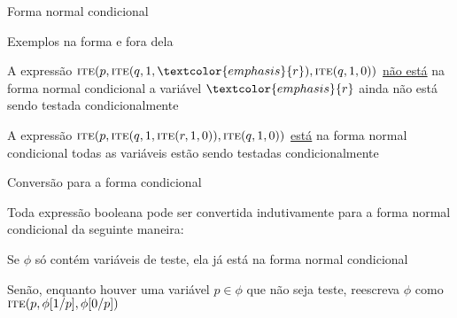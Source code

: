 \expandafter\documentclass\expandafter[table, usenames, svgnames, dvipsnames,14pt, \classopts]{beamer}
\begin{document}
\begin{frame}{Forma normal condicional}

    \begin{center}
    \end{center}

\end{frame}

\begin{frame}{Exemplos na forma e fora dela}

    \small
    \begin{outline}
        \1 A expressão $\textproc{ite}(p, \textproc{ite}(q, 1, \textcolor{emphasis}{r}), \textproc{ite}(q, 1, 0))$ \underline{não está} na forma normal condicional
            \2[-] a variável $\textcolor{emphasis}{r}$ ainda não está sendo testada condicionalmente

        \vspace{1em}
            
        \1 A expressão $\textproc{ite}(p, \textproc{ite}(q, 1, \textproc{ite}(r, 1, 0)), \textproc{ite}(q, 1, 0))$ \underline{está} na forma normal condicional        
            \2[-] todas as variáveis estão sendo testadas condicionalmente
    \end{outline}

\end{frame}

\begin{frame}{Conversão para a forma condicional}

    Toda expressão booleana pode ser convertida indutivamente para a forma normal condicional da seguinte maneira:

    \begin{outline}
        \1 Se $\phi$ só contém variáveis de teste, ela já está na forma normal condicional
        
        \vspace{1em}
        
        \1 Senão, enquanto houver uma variável $p \in \phi$ que não seja teste, reescreva $\phi$ como $\textproc{ite}(p, \phi[1/p], \phi[0/p])$
    \end{outline}

\end{frame}
\end{document}
